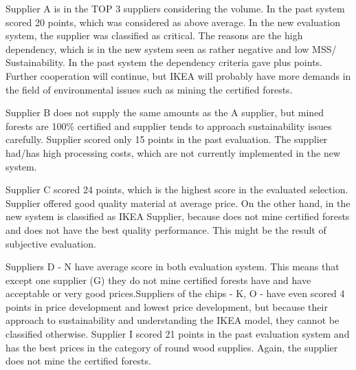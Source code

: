 \documentclass[oneside,12pt]{article}%
\begin{document}
\newline
Supplier A is in the TOP 3 suppliers considering the volume. In the past system scored 20 points, which was considered as above average. In the new evaluation system, the supplier was classified as critical. The reasons are the high dependency, which is in the new system seen as rather negative and low MSS/ Sustainability. In the past system the dependency criteria  gave plus points. Further cooperation will continue, but IKEA will probably have more demands in the field of environmental issues such as mining the certified forests. \par
Supplier B does not supply the same amounts as the A supplier, but mined forests are 100\% certified and supplier tends to approach sustainability issues carefully. Supplier scored only 15 points in the past evaluation. The supplier had/has high processing costs, which are not currently implemented in the new system. \par
Supplier C scored 24 points, which is the highest score in the evaluated selection. Supplier offered good quality material at average price. On the other hand, in the new system is classified as IKEA Supplier, because does not mine certified forests and does not have the best quality performance. This might be the result of subjective evaluation.\par
Suppliers D - N have average score in both evaluation system. This means that except one supplier (G) they do not mine certified forests have and have acceptable or very good prices.Suppliers of the chips - K, O -  have even scored 4 points in price development and lowest price development, but because their approach to sustainability and understanding the IKEA model, they cannot be classified otherwise. Supplier I scored 21 points in the past evaluation system and has the best prices in the category of round wood supplies. Again, the supplier does not mine the certified forests.



\end{document}
